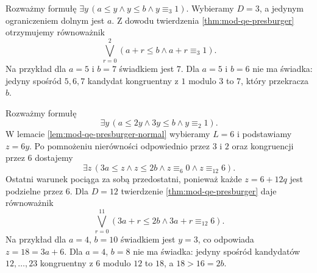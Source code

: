 \begin{przyklad}
\label{ex:mod-qe-presburger-interval}
Rozważmy formułę
$\exists y\,(a\leq y\land y\leq b\land y\equiv_3 1)$.
Wybieramy $D=3$, a jedynym ograniczeniem dolnym jest $a$.
Z dowodu twierdzenia \ref{thm:mod-qe-presburger}
otrzymujemy równoważnik
\[
\bigvee_{r=0}^{2}
(a+r\leq b\land a+r\equiv_3 1).
\]
Na przykład dla $a=5$ i $b=7$ świadkiem jest $7$.
Dla $a=5$ i $b=6$ nie ma świadka: jedyny spośród
$5,6,7$ kandydat kongruentny z $1$ modulo $3$ to $7$,
który przekracza $b$.
\end{przyklad}

\begin{przyklad}
\label{ex:mod-qe-presburger-scale}
Rozważmy formułę
\[
\exists y\,(a\leq 2y\land 3y\leq b\land y\equiv_2 1).
\]
W lemacie \ref{lem:mod-qe-presburger-normal} wybieramy
$L=6$ i podstawiamy $z=6y$. Po pomnożeniu nierówności
odpowiednio przez $3$ i $2$ oraz kongruencji przez $6$
dostajemy
\[
\exists z\,(3a\leq z\land z\leq 2b\land
 z\equiv_6 0\land z\equiv_{12}6).
\]
Ostatni warunek pociąga za sobą przedostatni, ponieważ
każde $z=6+12q$ jest podzielne przez $6$.
Dla $D=12$ twierdzenie \ref{thm:mod-qe-presburger}
daje równoważnik
\[
\bigvee_{r=0}^{11}
(3a+r\leq 2b\land 3a+r\equiv_{12}6).
\]
Na przykład dla $a=4$, $b=10$ świadkiem jest $y=3$,
co odpowiada $z=18=3a+6$. Dla $a=4$, $b=8$ nie ma
świadka: jedyny spośród kandydatów $12,\ldots,23$
kongruentny z $6$ modulo $12$ to $18$, a $18>16=2b$.
\end{przyklad}

